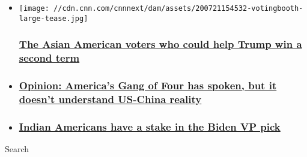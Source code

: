\begin{itemize}
\item
  \href{/2020/08/05/opinions/asian-american-vietnamese-trump-election-vu/index.html}{}

  \texttt{[image: //cdn.cnn.com/cnnnext/dam/assets/200721154532-votingbooth-large-tease.jpg]}

  \hypertarget{the-asian-american-voters-who-could-help-trump-win-a-second-term}{%
  \subsubsection{\texorpdfstring{\href{/2020/08/05/opinions/asian-american-vietnamese-trump-election-vu/index.html}{The
  Asian American voters who could help Trump win a second
  term}}{The Asian American voters who could help Trump win a second term}}\label{the-asian-american-voters-who-could-help-trump-win-a-second-term}}
\item
  \hypertarget{opinion-americas-gang-of-four-has-spoken-but-it-doesnt-understand-us-china-reality}{%
  \subsubsection{\texorpdfstring{\href{/2020/08/04/opinions/americas-gang-of-four-stephen-roach/index.html}{Opinion:
  America's Gang of Four has spoken, but it doesn't understand US-China
  reality}}{Opinion: America's Gang of Four has spoken, but it doesn't understand US-China reality}}\label{opinion-americas-gang-of-four-has-spoken-but-it-doesnt-understand-us-china-reality}}
\item
  \hypertarget{indian-americans-have-a-stake-in-the-biden-vp-pick}{%
  \subsubsection{\texorpdfstring{\href{/2020/08/03/opinions/kamala-harris-asian-americans-vp-pick-biden-makhija/index.html}{Indian
  Americans have a stake in the Biden VP
  pick}}{Indian Americans have a stake in the Biden VP pick}}\label{indian-americans-have-a-stake-in-the-biden-vp-pick}}
\end{itemize}

Search

